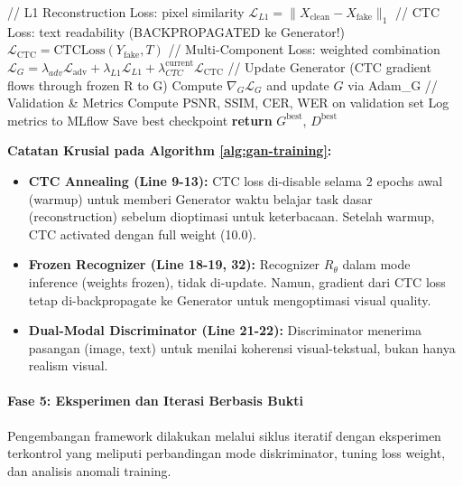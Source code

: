 \documentclass[12pt,a4paper]{article}
\begin{document}
\begin{algorithm}[H]
\begin{algorithmic}[1]
        \STATE
        \STATE // L1 Reconstruction Loss: pixel similarity
        \STATE $\mathcal{L}_{L1} = \|X_{\text{clean}} - X_{\text{fake}}\|_1$
        \STATE
        \STATE // CTC Loss: text readability (BACKPROPAGATED ke Generator!)
        \STATE $\mathcal{L}_{\text{CTC}} = \text{CTCLoss}(Y_{\text{fake}}, T)$
        \STATE
        \STATE // Multi-Component Loss: weighted combination
        \STATE $\mathcal{L}_G = \lambda_{adv} \mathcal{L}_{\text{adv}} + \lambda_{L1} \mathcal{L}_{L1} + \lambda_{CTC}^{\text{current}} \mathcal{L}_{\text{CTC}}$
        \STATE
        \STATE // Update Generator (CTC gradient flows through frozen R to G)
        \STATE Compute $\nabla_G \mathcal{L}_G$ and update $G$ via Adam\_G
    \ENDFOR
    \STATE
    \STATE // Validation \& Metrics
    \STATE Compute PSNR, SSIM, CER, WER on validation set
    \STATE Log metrics to MLflow
    \STATE
        \STATE Save best checkpoint
    \ENDIF
\ENDFOR
\STATE \textbf{return} $G^{\text{best}}$, $D^{\text{best}}$
\end{algorithmic}
\end{algorithm}

\textbf{Catatan Krusial pada Algorithm \ref{alg:gan-training}:}
\begin{itemize}[nosep]
    \item \textbf{CTC Annealing (Line 9-13):} CTC loss di-disable selama 2 epochs awal (warmup) untuk memberi Generator waktu belajar task dasar (reconstruction) sebelum dioptimasi untuk keterbacaan. Setelah warmup, CTC activated dengan full weight (10.0).
    \item \textbf{Frozen Recognizer (Line 18-19, 32):} Recognizer $R_{\theta}$ dalam mode inference (weights frozen), tidak di-update. Namun, gradient dari CTC loss tetap di-backpropagate ke Generator untuk mengoptimasi visual quality.
    \item \textbf{Dual-Modal Discriminator (Line 21-22):} Discriminator menerima pasangan (image, text) untuk menilai koherensi visual-tekstual, bukan hanya realism visual.
\end{itemize}

\paragraph{Fase 5: Eksperimen dan Iterasi Berbasis Bukti}
Pengembangan framework dilakukan melalui siklus iteratif dengan eksperimen terkontrol yang meliputi perbandingan mode diskriminator, tuning loss weight, dan analisis anomali training.
\end{document}
